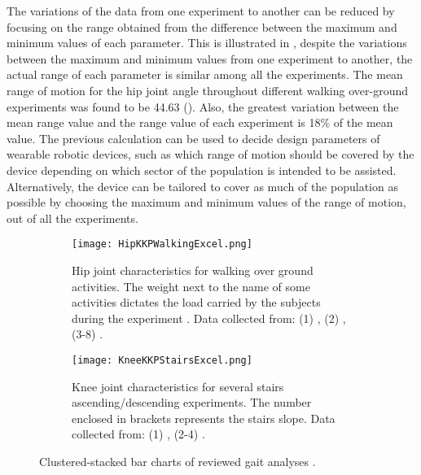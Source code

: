 The variations of the data from one experiment to another can be reduced by focusing on the range obtained from the difference between the maximum and minimum values of each parameter. This is illustrated in , despite the variations between the maximum and minimum values from one experiment to another, the actual range of each parameter is similar among all the experiments. The mean range of motion for the hip joint angle throughout different walking over-ground experiments was found to be 44.63\degree{} (). Also, the greatest variation between the mean range value and the range value of each experiment is 18\% of the mean value. The previous calculation can be used to decide design parameters of wearable robotic devices, such as which range of motion should be covered by the device depending on which sector of the population is intended to be assisted. Alternatively, the device can be tailored to cover as much of the population as possible by choosing the maximum and minimum values of the range of motion, out of all the experiments. 
\begin{figure}[htbp]
    \centering
    \begin{subfigure}[b]{0.75\textwidth}
        \centering
        \texttt{[image: HipKKPWalkingExcel.png]}
        \caption{Hip joint characteristics for walking over ground activities. The weight next to the name of some activities dictates the load carried by the subjects during the experiment \cite{solis2017characterization}. Data collected from: (1) \cite{bovi2011multiple}, (2) \cite{lee2008biomechanics}, (3-8) \cite{han2011biomechanical}. }
        \label{fig:HipKKPWalking}
    \end{subfigure}
    \hfill
    \begin{subfigure}[b]{0.75\textwidth}
        \centering
        \texttt{[image: KneeKKPStairsExcel.png]}
        \caption{Knee joint characteristics for several stairs ascending/descending experiments. The number enclosed in brackets represents the stairs slope. Data collected from: (1) \cite{riener2002stair}, (2-4) \cite{reid2007knee}. }
        \label{fig:KneeKKPWalking}
    \end{subfigure}
    \caption[Clustered-stacked bar charts of reviewed gait analyses.]{Clustered-stacked bar charts of reviewed gait analyses \cite{solis2017characterization}. }
    \label{fig:clusteredMain}
\end{figure}

